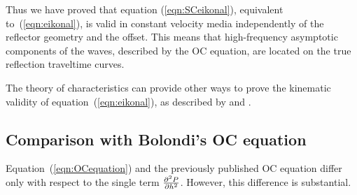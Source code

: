
Thus we have proved that equation
(\ref{eqn:SCeikonal}), equivalent to~(\ref{eqn:eikonal}), is valid in constant
velocity media independently of the reflector geometry and the offset.
This means that high-frequency asymptotic components of the waves,
described by the OC equation,
are located on the true reflection traveltime curves.  

The theory of characteristics can provide other ways to prove the
kinematic validity of equation~(\ref{eqn:eikonal}), as described by
\cite{me} and \cite{plag}.

\subsection{Comparison with Bolondi's OC equation}
Equation~(\ref{eqn:OCequation}) and the previously published OC
equation \cite[]{GPR30-06-08130828} differ only with respect to the
single term $\partial^2 P \over {\partial h^2}$. However, this
difference is substantial.  

